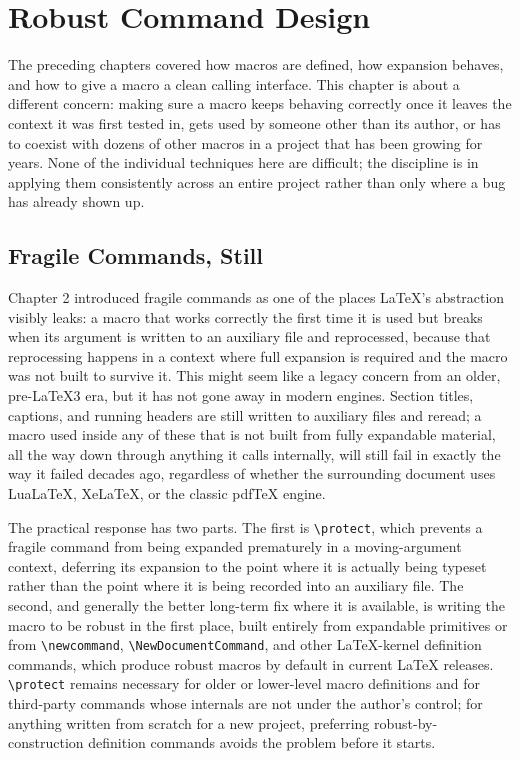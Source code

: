 \hypertarget{chapter-8-robust-command-design}{%
\chapter{Robust Command Design}\label{chapter-8-robust-command-design}}

The preceding chapters covered how macros are defined, how expansion behaves, and how to give a macro a clean calling interface. This chapter is about a different concern: making sure a macro keeps behaving correctly once it leaves the context it was first tested in, gets used by someone other than its author, or has to coexist with dozens of other macros in a project that has been growing for years. None of the individual techniques here are difficult; the discipline is in applying them consistently across an entire project rather than only where a bug has already shown up.

\hypertarget{fragile-commands-still}{%
\section{Fragile Commands, Still}\label{fragile-commands-still}}

Chapter 2 introduced fragile commands as one of the places LaTeX's abstraction visibly leaks: a macro that works correctly the first time it is used but breaks when its argument is written to an auxiliary file and reprocessed, because that reprocessing happens in a context where full expansion is required and the macro was not built to survive it. This might seem like a legacy concern from an older, pre-LaTeX3 era, but it has not gone away in modern engines. Section titles, captions, and running headers are still written to auxiliary files and reread; a macro used inside any of these that is not built from fully expandable material, all the way down through anything it calls internally, will still fail in exactly the way it failed decades ago, regardless of whether the surrounding document uses LuaLaTeX, XeLaTeX, or the classic pdfTeX engine.

The practical response has two parts. The first is \texttt{\textbackslash{}protect}, which prevents a fragile command from being expanded prematurely in a moving-argument context, deferring its expansion to the point where it is actually being typeset rather than the point where it is being recorded into an auxiliary file. The second, and generally the better long-term fix where it is available, is writing the macro to be robust in the first place, built entirely from expandable primitives or from \texttt{\textbackslash{}newcommand}, \texttt{\textbackslash{}NewDocumentCommand}, and other LaTeX-kernel definition commands, which produce robust macros by default in current LaTeX releases. \texttt{\textbackslash{}protect} remains necessary for older or lower-level macro definitions and for third-party commands whose internals are not under the author's control; for anything written from scratch for a new project, preferring robust-by-construction definition commands avoids the problem before it starts.

